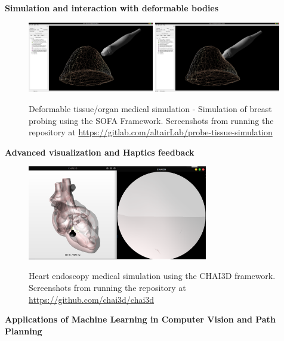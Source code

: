 \textbf{Simulation and interaction with deformable bodies} \\

\begin{center}
\begin{figure}[H]
\centering
\includegraphics[width=0.49\textwidth]{images/future-work-sofa1.png}
\includegraphics[width=0.49\textwidth]{images/future-work-sofa2.png}\\
\caption{Deformable tissue/organ medical simulation - Simulation of breast probing using the SOFA Framework. Screenshots from running the repository at
\url{https://gitlab.com/altairLab/probe-tissue-simulation}}
\end{figure}
\end{center}

\textbf{Advanced visualization and Haptics feedback} \\

\begin{center}
\begin{figure}[H]
\centering
\includegraphics[width=0.7\textwidth]{images/future-work-chai3d.png}\\
\caption{Heart endoscopy medical simulation using the CHAI3D framework. Screenshots from running the repository at
\url{https://github.com/chai3d/chai3d}}
\end{figure}
\end{center}

\textbf{Applications of Machine Learning in Computer Vision and Path Planning} \\